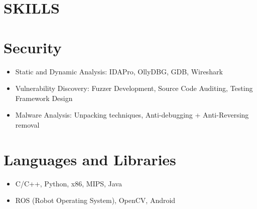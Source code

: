 \documentclass[margin]{res}
\begin{document}
\begin{resume}
\section{SKILLS}
\normalsize{\section{Security}}
                 \begin{itemize} \itemsep -2pt
                 \item Static and Dynamic Analysis: IDAPro, OllyDBG,
                   GDB, Wireshark
                 \item Vulnerability Discovery: Fuzzer Development,
                   Source Code Auditing, Testing Framework Design
                 \item Malware Analysis: Unpacking techniques,
                     Anti-debugging + Anti-Reversing removal
                 \end{itemize}
\normalsize{\section{Languages and Libraries}}
	           \begin{itemize} \itemsep -2pt %
                   \item C/C++, Python, x86, MIPS, Java
                   \item ROS (Robot Operating System), OpenCV, Android
                   \end{itemize}


\end{resume}
\end{document}
